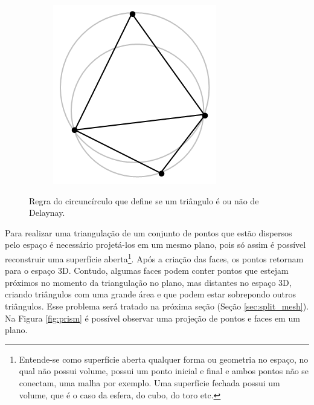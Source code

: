 \begin{figure}[H]
\begin{subfigure}[t]{0.27\textwidth}
        \caption{}
        \label{fig:delaunay_theorem2}
    \end{subfigure}
    \hspace{2em}
    \begin{subfigure}[t]{0.2\textwidth}
        \includegraphics[width=\textwidth]{dados/figuras/delaunay_theorem3.png}
        \caption{}
        \label{fig:delaunay_theorem3}
    \end{subfigure}
    \caption{Regra do circuncírculo que define se um triângulo é ou não de Delaynay.}
    \label{fig:delaunay_theorem}
\end{figure}

Para realizar uma triangulação de um conjunto de pontos que estão dispersos pelo espaço é necessário projetá-los em um mesmo plano, pois só assim é possível reconstruir uma superfície aberta\footnote{Entende-se como superfície aberta qualquer forma ou geometria no espaço, no qual não possui volume, possui um ponto inicial e final e ambos pontos não se conectam, uma malha por exemplo. Uma superfície fechada possui um volume, que é o caso da esfera, do cubo, do toro etc.}.
Após a criação das faces, os pontos retornam para o espaço 3D.
Contudo, algumas faces podem conter pontos que estejam próximos no momento da triangulação no plano, mas distantes no espaço 3D, criando triângulos com uma grande área e que podem estar sobrepondo outros triângulos. 
Esse problema será tratado na próxima seção (Seção \ref{sec:split_mesh}).
Na Figura \ref{fig:prism} é possível observar uma projeção de pontos e faces em um plano.


